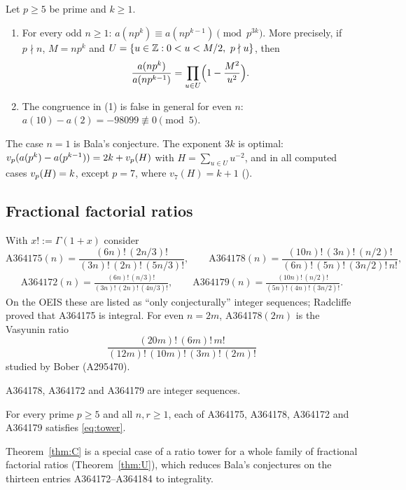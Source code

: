 \documentclass[11pt]{amsart}
\begin{document}
\begin{theorem}\label{thm:A}
Let $p\ge5$ be prime and $k\ge1$.
\begin{enumerate}
\item For every odd $n\ge1$: $a(np^k)\equiv a(np^{k-1})\pmod{p^{3k}}$. More precisely, if $p\nmid n$, $M=np^k$ and $U=\{u\in\mathbb{Z}:0<u<M/2,\ p\nmid u\}$, then
\begin{equation}\label{eq:collapse}
\frac{a(np^k)}{a(np^{k-1})}=\prod_{u\in U}\Bigl(1-\frac{M^2}{u^2}\Bigr).
\end{equation}
\item The congruence in (1) is false in general for even $n$: $a(10)-a(2)=-98099\not\equiv0\pmod5$.
\end{enumerate}
\end{theorem}
The case $n=1$ is Bala's conjecture. The exponent $3k$ is optimal: $v_p(a(p^k)-a(p^{k-1}))=2k+v_p(H)$ with $H=\sum_{u\in U}u^{-2}$, and in all computed cases $v_p(H)=k$, except $p=7$, where $v_7(H)=k+1$ ().

\subsection*{Fractional factorial ratios} With $x!:=\Gamma(1+x)$ consider
\[ \text{A364175}(n)=\frac{(6n)!\,(2n/3)!}{(3n)!\,(2n)!\,(5n/3)!},\qquad \text{A364178}(n)=\frac{(10n)!\,(3n)!\,(n/2)!}{(6n)!\,(5n)!\,(3n/2)!\,n!}, \]
\begin{gather*}
\text{A364172}(n)=\frac{(6n)!\,(n/3)!}{(3n)!\,(2n)!\,(4n/3)!},\qquad \text{A364179}(n)=\frac{(10n)!\,(n/2)!}{(5n)!\,(4n)!\,(3n/2)!}.
\end{gather*}
On the OEIS these are listed as ``only conjecturally'' integer sequences; Radcliffe \cite{radcliffe2026} proved that A364175 is integral. For even $n=2m$, A364178$(2m)$ is the Vasyunin ratio
\[ \frac{(20m)!\,(6m)!\,m!}{(12m)!\,(10m)!\,(3m)!\,(2m)!} \]
studied by Bober \cite{bober2009} (A295470).

\begin{theorem}\label{thm:B}
A364178, A364172 and A364179 are integer sequences.
\end{theorem}

\begin{theorem}\label{thm:C}
For every prime $p\ge5$ and all $n,r\ge1$, each of A364175, A364178, A364172 and A364179 satisfies \eqref{eq:tower}.
\end{theorem}

Theorem~\ref{thm:C} is a special case of a ratio tower for a whole family of fractional factorial ratios (Theorem~\ref{thm:U}), which reduces Bala's conjectures on the thirteen entries A364172--A364184 to integrality.
\end{document}
